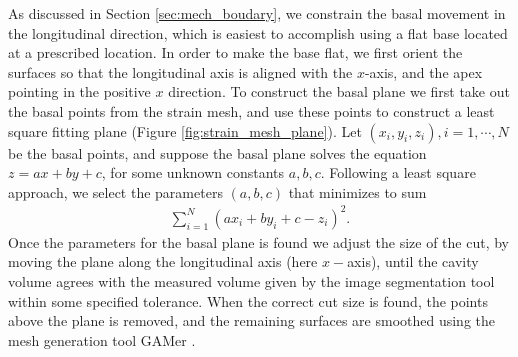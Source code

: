 As discussed in Section \ref{sec:mech_boudary}, we constrain the basal movement in
the longitudinal direction, which is easiest to accomplish using a flat
base located at a prescribed location. In order to make the base flat,
we first orient the surfaces so that the longitudinal axis is aligned
with the $x$-axis, and the apex pointing in the positive $x$
direction. To construct the basal plane we first take out the basal
points from the strain mesh, and use these points to construct a least
square fitting plane (Figure \ref{fig:strain_mesh_plane}). Let $(x_i, y_i, z_i), i = 1, \cdots, N$
be the basal points, and suppose the basal plane solves the equation
$z = ax + by + c$, for some unknown constants $a,b,c$. Following a
least square approach, we select the parameters $(a,b,c)$ that
minimizes to sum
\begin{align}
  \sum_{i = 1}^{N} \left(ax_i + by_i + c  - z_i \right)^2.
\end{align}
Once the parameters for the basal plane is found we adjust the size of
the cut, by moving the plane along the longitudinal axis (here
$x-$axis), until the cavity volume agrees with the measured volume
given by the image segmentation tool within some specified tolerance. 
When the correct cut size is found, the points above the plane is removed,
and the remaining surfaces are smoothed using the mesh generation tool GAMer
\cite{yu2008feature}.

